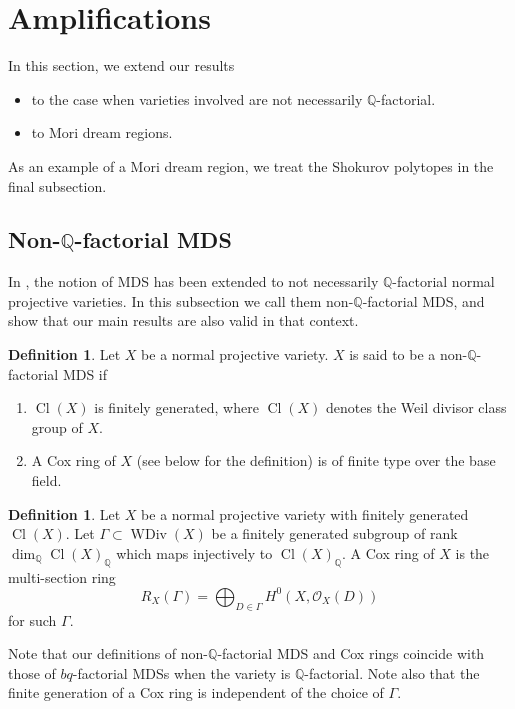 \documentclass[12pt,twoside]{amsart}
\theoremstyle{definition}
\newtheorem{defi}[theo]{Definition}
\newcommand\Cl{\mathop{\mathrm{Cl}}\nolimits}
\newcommand\WDivi{\mathop{\mathrm{WDiv}}\nolimits}
\newcommand\bq{\mathbb{Q}}
\newcommand\OO{\mathcal{O}}
\begin{document}
\section{Amplifications}\label{Amplifications}

In this section, we extend our results
\begin{itemize}
\item to the case when varieties involved are not necessarily $\bq$-factorial.
\item to Mori dream regions.
\end{itemize}
As an example of a Mori dream region, we treat the Shokurov polytopes in the final subsection.

\subsection{Non-$\bq$-factorial MDS}\label{Non-Q-factorial MDS}
In \cite[\S 2]{ahl}, the notion of MDS has been extended to not necessarily $\bq$-factorial normal projective varieties.
In this subsection we call them non-$\bq$-factorial MDS, and
show that our main results are also valid in that context.

\begin{defi}\label{nQfMDS}
Let $X$ be a normal projective variety. $X$ is said to be a non-$\bq$-factorial MDS if
\begin{enumerate}
\item $\Cl{(X)}$ is finitely generated, where $\Cl{(X)}$ denotes the
Weil divisor class group of $X$.
\item A Cox ring of $X$ (see below for the definition) is of finite type over the base field.
\end{enumerate}
\end{defi}
\begin{defi}
Let $X$ be a normal projective variety with finitely generated $\Cl{(X)}$.
Let $\Gamma\subset\WDivi{(X)}$ be a finitely generated subgroup of rank $\dim_{\bq}\Cl{(X)}_{\bq}$ which maps
injectively to $\Cl{(X)}_{\bq}$. A Cox ring of $X$ is the multi-section ring
\begin{equation*}
R_{X}(\Gamma)=\bigoplus_{D\in\Gamma}H^0(X,\OO_{X}(D))
\end{equation*}
for such $\Gamma$.
\end{defi}
Note that our definitions of non-$\bq$-factorial MDS and Cox rings coincide with those of
$bq$-factorial MDSs when the variety is $\bq$-factorial.
Note also that the finite generation of a Cox ring is independent of the choice of $\Gamma$.
\end{document}
